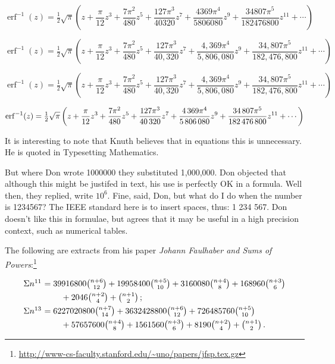 {\[
\operatorname{erf}^{-1}(z)=\tfrac{1}{2}\sqrt{\pi}\left (z+\frac{\pi}{12}z^3+\frac{7\pi^2}{480}z^5+\frac{127\pi^3}{40320}z^7+\frac{4369\pi^4}{5806080}z^9+\frac{34807\pi^5}{182476800}z^{11}+\cdots\right )
\]


\[
\operatorname{erf}^{-1}(z)=\tfrac{1}{2}\sqrt{\pi}\left (z+\frac{\pi}{12}z^3+\frac{7\pi^2}{480}z^5+\frac{127\pi^3}{40,320}z^7+\frac{4,369\pi^4}{5,806,080}z^9+\frac{34,807\pi^5}{182,476,800}z^{11}+\cdots\right )
\]

\[
\operatorname{erf}^{-1}(z)=\tfrac{1}{2}\sqrt{\pi}\left (z+\frac{\pi}{12}z^3+\frac{7\pi^2}{480}z^5+\frac{127\pi^3}{40{,}320}z^7+\frac{4{,}369\pi^4}{5{,}806{,}080}z^9+\frac{34{,}807\pi^5}{182{,}476,800}z^{11}+\cdots\right )
\]



\[
\operatorname{erf}^{-1}(z)=\tfrac{1}{2}\sqrt{\pi}\left (z+\frac{\pi}{12}z^3+\frac{7\pi^2}{480}z^5+\frac{127\pi^3}{40\thinspace 320}z^7+\frac{4\thinspace 369\pi^4}{5\thinspace 806\thinspace 080}z^9+\frac{34\thinspace 807\pi^5}{182\thinspace 476\thinspace 800}z^{11}+\cdots\right )
\]


It is interesting to note that Knuth believes that in equations this is unnecessary.
He is quoted in Typesetting Mathematics.


\begin{latexquotation}
But where Don wrote 1000000 they substituted
1,000,000. Don objected that although this might be justifed in text, his use is perfectly OK in a formula. Well then, they replied, write \(10^6\).
Fine, said, Don, but what do I do 
when the number is 1234567? The IEEE standard here is to insert spaces, thus: 1 234 567.
Don doesn't like this in formulae, but agrees that it may be useful in a high precision context, such as numerical tables. 
\end{latexquotation}



The following are extracts from his paper \textit{Johann Faulhaber and Sums of Powers}:\footnote{\url{http://www-cs-faculty.stanford.edu/~uno/papers/jfsp.tex.gz}}

{
\[\vcenter{\halign{$#$\hfil\ &$#$\hfil\cr
\Sigma n^{11}&=39916800{n+6\choose 12}+
19958400{n+5\choose 10}+3160080{n+4\choose 8}
+168960{n+3\choose 6}\cr
\noalign{\smallskip}
&\qquad\null+2046{n+2\choose 4}+{n+1\choose 2}\,;\cr
\noalign{\smallskip}
\Sigma n^{13}&=6227020800{n+7\choose 14}+3632428800{n+6\choose 12}+
726485760{n+5\choose 10}\cr
\noalign{\smallskip}
&\qquad\null+57657600{n+4\choose 8}
+1561560{n+3\choose 6}+8190{n+2\choose 4}+\binom{n+1}{2}\,.\cr}}\]
}

}
